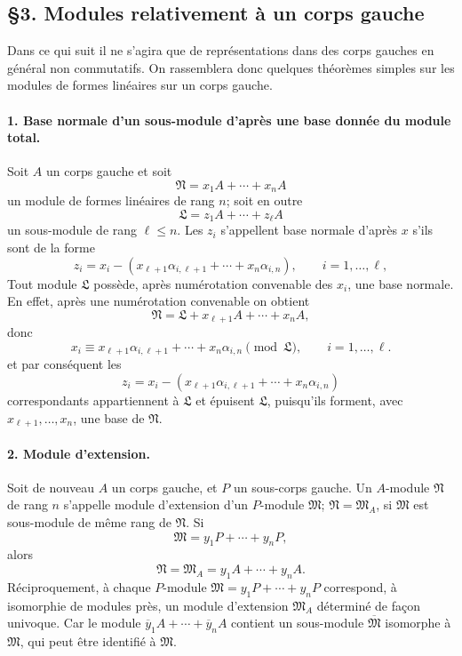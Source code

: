 \providecommand{\frG}{\mathfrak G}
\providecommand{\frL}{\mathfrak L}
\providecommand{\frM}{\mathfrak M}
\providecommand{\frN}{\mathfrak N}
\providecommand{\frT}{\mathfrak T}

\subsection*{\S 3. Modules relativement à un corps gauche}

Dans ce qui suit il ne s'agira que de représentations dans des corps gauches en général non commutatifs. On rassemblera donc quelques théorèmes simples sur les modules de formes linéaires sur un corps gauche.

\paragraph{1. Base normale d'un sous-module d'après une base donnée du module total.}
Soit \(A\) un corps gauche et soit
\[
        \frN=x_1A+\cdots+x_nA
\]
un module de formes linéaires de rang \(n\); soit en outre
\[
        \frL=z_1A+\cdots+z_\ell A
\]
un sous-module de rang \(\ell\le n\). Les \(z_i\) s'appellent base normale d'après \(x\) s'ils sont de la forme
\[
        z_i=x_i-(x_{\ell+1}\alpha_{i,\ell+1}+\cdots+x_n\alpha_{i,n}),
        \qquad i=1,\ldots,\ell,
\]
Tout module \(\frL\) possède, après numérotation convenable des \(x_i\), une base normale. En effet, après une numérotation convenable on obtient
\[
        \frN=\frL+x_{\ell+1}A+\cdots+x_nA,
\]
donc
\[
        x_i\equiv x_{\ell+1}\alpha_{i,\ell+1}+\cdots+x_n\alpha_{i,n}
        \pmod{\frL},\qquad i=1,\ldots,\ell. \tag{2}
\]
et par conséquent les
\[
        z_i=x_i-(x_{\ell+1}\alpha_{i,\ell+1}+\cdots+x_n\alpha_{i,n})
\]
correspondants appartiennent à \(\frL\) et épuisent \(\frL\), puisqu'ils forment, avec \(x_{\ell+1},\ldots,x_n\), une base de \(\frN\).

\paragraph{2. Module d'extension.}
Soit de nouveau \(A\) un corps gauche, et \(P\) un sous-corps gauche. Un \(A\)-module \(\frN\) de rang \(n\) s'appelle module d'extension d'un \(P\)-module \(\frM\); \(\frN=\frM_A\), si \(\frM\) est sous-module de même rang de \(\frN\). Si
\[
        \frM=y_1P+\cdots+y_nP,
\]
alors
\[
        \frN=\frM_A=y_1A+\cdots+y_nA.
\]
Réciproquement, à chaque \(P\)-module \(\frM=y_1P+\cdots+y_nP\) correspond, à isomorphie de modules près, un module d'extension \(\frM_A\) déterminé de façon univoque. Car le module \(\overline y_1A+\cdots+\overline y_nA\) contient un sous-module \(\overline{\frM}\) isomorphe à \(\frM\), qui peut être identifié à \(\frM\).

